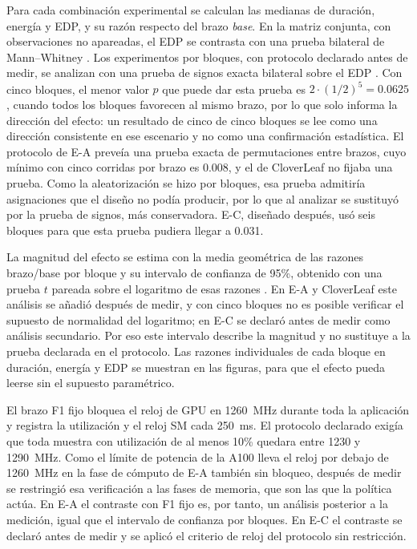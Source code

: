 Para cada combinación experimental se calculan las medianas de duración, energía y EDP, y su razón respecto del brazo \textit{base}. En la matriz conjunta, con observaciones no apareadas, el EDP se contrasta con una prueba bilateral de Mann--Whitney \cite{Hollander2014}. Los experimentos por bloques, con protocolo declarado antes de medir, se analizan con una prueba de signos exacta bilateral sobre el EDP \cite{Hollander2014}. Con cinco bloques, el menor valor $p$ que puede dar esta prueba es $2\cdot(1/2)^5=0.0625$, cuando todos los bloques favorecen al mismo brazo, por lo que solo informa la dirección del efecto: un resultado de cinco de cinco bloques se lee como una dirección consistente en ese escenario y no como una confirmación estadística. El protocolo de E-A preveía una prueba exacta de permutaciones entre brazos, cuyo mínimo con cinco corridas por brazo es 0.008, y el de CloverLeaf no fijaba una prueba. Como la aleatorización se hizo por bloques, esa prueba admitiría asignaciones que el diseño no podía producir, por lo que al analizar se sustituyó por la prueba de signos, más conservadora. E-C, diseñado después, usó seis bloques para que esta prueba pudiera llegar a 0.031.

La magnitud del efecto se estima con la media geométrica de las razones brazo/base por bloque y su intervalo de confianza de 95\%, obtenido con una prueba $t$ pareada sobre el logaritmo de esas razones \cite{Montgomery2017}. En E-A y CloverLeaf este análisis se añadió después de medir, y con cinco bloques no es posible verificar el supuesto de normalidad del logaritmo; en E-C se declaró antes de medir como análisis secundario. Por eso este intervalo describe la magnitud y no sustituye a la prueba declarada en el protocolo. Las razones individuales de cada bloque en duración, energía y EDP se muestran en las figuras, para que el efecto pueda leerse sin el supuesto paramétrico.

El brazo F1 fijo bloquea el reloj de GPU en 1260~MHz durante toda la aplicación y registra la utilización y el reloj SM cada 250~ms. El protocolo declarado exigía que toda muestra con utilización de al menos 10\% quedara entre 1230 y 1290~MHz. Como el límite de potencia de la A100 lleva el reloj por debajo de 1260~MHz en la fase de cómputo de E-A también sin bloqueo, después de medir se restringió esa verificación a las fases de memoria, que son las que la política actúa. En E-A el contraste con F1 fijo es, por tanto, un análisis posterior a la medición, igual que el intervalo de confianza por bloques. En E-C el contraste se declaró antes de medir y se aplicó el criterio de reloj del protocolo sin restricción.

